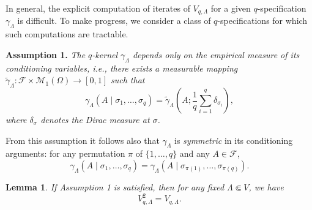 \documentclass[11pt,reqno]{amsart}
\newtheorem{lemma}{Lemma}
\numberwithin{equation}{section} \setcounter{tocdepth}{1}
\begin{document}
\medskip
In general, the explicit computation of iterates of $V_{q,\Lambda}$ for a given $q$-specification $\gamma_\Lambda$ is difficult. 
To make progress, we consider a class of $q$-specifications for which such computations are tractable.

{\bf Assumption 1.} {\it The $q$-kernel $\gamma_\Lambda$ depends only on the empirical measure 
	of its conditioning variables, i.e., there exists a measurable mapping
	$\tilde{\gamma}_\Lambda : \mathcal F \times \mathcal M_1(\Omega) \to [0,1]$ such that
	$$
	\gamma_\Lambda(A \mid \sigma_1, \dots, \sigma_q)
	= \tilde{\gamma}_\Lambda\!\left(A; \frac{1}{q} \sum_{i=1}^q \delta_{\sigma_i}\right),
	$$
	where $\delta_{\sigma}$ denotes the Dirac measure at $\sigma$.} 
	
	From this assumption it follows also that  $\gamma_\Lambda$ is \emph{symmetric} in its conditioning arguments: for any permutation $\pi$ of $\{1,\dots,q\}$ and any $A \in \mathcal{F}$,
	$$
	\gamma_\Lambda(A \mid \sigma_1, \dots, \sigma_q)
	= \gamma_\Lambda(A \mid \sigma_{\pi(1)}, \dots, \sigma_{\pi(q)}).
	$$

\begin{lemma}\label{VV}
	If Assumption 1 is satisfied, then for any fixed $\Lambda \Subset V$, we have
	$$
	V_{q,\Lambda}^2 = V_{q,\Lambda}.
	$$
\end{lemma}
\end{document}
